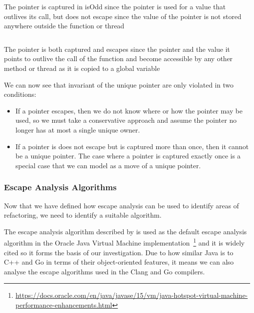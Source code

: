 \documentclass{proposal}
\begin{document}
    \begin{listing}
        \inputminted{c++}{code/capture-example.cpp}
        \caption{The pointer is captured in isOdd since the pointer is used for a value that outlives its call, but does not escape since the value of the pointer is not stored anywhere outside the function or thread}
        \label{lst:capture-example}
    \end{listing}

    \begin{listing}
        \inputminted{c++}{code/escape-example.cpp}
        \caption{The pointer is both captured and escapes since the pointer and the value it points to outlive the call of the function and become accessible by any other method or thread as it is copied to a global variable}
        \label{lst:escape-example}
    \end{listing}

    We can now see that invariant of the unique pointer are only violated in two conditions:
    \begin{itemize}
        \item If a pointer escapes, then we do not know where or how the pointer may be used, so we must take a conservative approach and assume the pointer no longer has at most a single unique owner.
        \item If a pointer is does not escape but is captured more than once, then it cannot be a unique pointer.
        The case where a pointer is captured exactly once is a special case that we can model as a move of a unique pointer.
    \end{itemize}

    \subsubsection{Escape Analysis Algorithms}\label{subsubsec:escape-analysis-algorithms}

    Now that we have defined how escape analysis can be used to identify areas of refactoring, we need to identify a suitable algorithm.

    The escape analysis algorithm described by \citet{Choi1999} is used as the default escape analysis algorithm in the Oracle Java Virtual Machine implementation~\footnote{\url{https://docs.oracle.com/en/java/javase/15/vm/java-hotspot-virtual-machine-performance-enhancements.html}} and it is widely cited so it forms the basis of our investigation.
    Due to how similar Java is to C++ and Go in terms of their object-oriented features, it means we can also analyse the escape algorithms used in the Clang and Go compilers.
\end{document}
